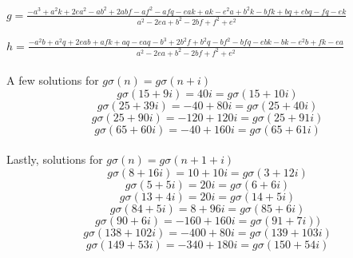 \documentclass[12pt]{amsart}
\begin{document}
$g =\frac{-a^3 + a^2k + 2ea^2-ab^2+2abf-af^2-afq-eak+ak-e^2a+b^2k-bfk+bq+ebq-fq-ek}{a^2-2ea+b^2-2bf+f^2+e^2}$

$h = \frac{-a^2b+a^2q+2eab+afk+aq-eaq-b^3+2b^2f+b^2q-bf^2-bfq-ebk-bk-e^2b+fk-ea}{a^2-2ea+b^2-2bf+f^2+e^2} $
\\
\\
A few solutions for $g\sigma(n) = g\sigma(n+i)$
\\
$$g\sigma(15 + 9i) = 40i = g\sigma(15 + 10i)$$
$$g\sigma(25 + 39i) = -40 + 80i  = g\sigma( 25 + 40i)$$
$$g\sigma(25 + 90i) = -120 + 120i  = g\sigma(25 + 91i)$$
$$g\sigma(65 + 60i) = -40 + 160i = g\sigma(65 + 61i)$$
\\
Lastly, solutions for $g\sigma(n) = g\sigma(n+1+i)$
\\
$$g\sigma(8 + 16i) = 10 + 10i = g\sigma(3 + 12i)$$
$$g\sigma(5 + 5i) = 20i = g\sigma(6 + 6i)$$
$$g\sigma(13 + 4i) = 20i = g\sigma(14 + 5i)$$
$$g\sigma(84 + 5i) = 8 + 96i  = g\sigma(85 + 6i)$$
$$g\sigma(90 + 6i) = -160 + 160i  = g\sigma(91 + 7i))$$
$$g\sigma(138 + 102i) = -400 + 80i = g\sigma(139 + 103i)$$
$$g\sigma(149 + 53i) = -340 + 180i = g\sigma(150 + 54i)$$
\end{document}
